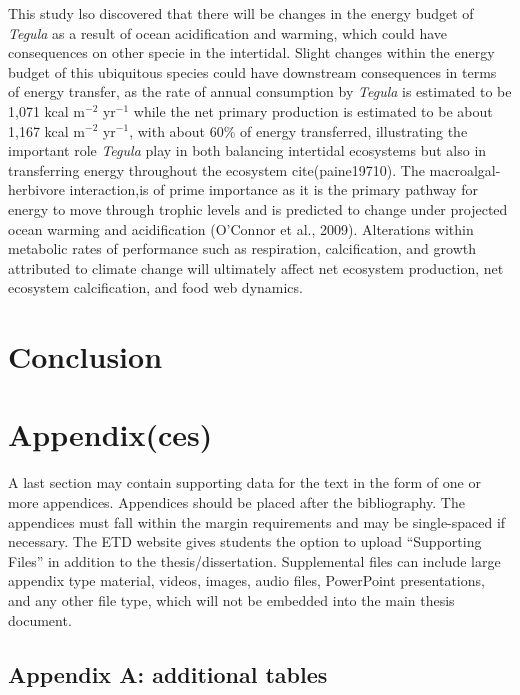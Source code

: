 \documentclass[
  12pt,
]{article}
\begin{document}
This study lso discovered that there will be changes in the energy
budget of \textit{Tegula} as a result of ocean acidification and
warming, which could have consequences on other specie in the
intertidal. Slight changes within the energy budget of this ubiquitous
species could have downstream consequences in terms of energy transfer,
as the rate of annual consumption by \textit{Tegula} is estimated to be
1,071 kcal m\(^{-2}\) yr\(^{-1}\) while the net primary production is
estimated to be about 1,167 kcal m\(^{-2}\) yr\(^{-1}\), with about 60\%
of energy transferred, illustrating the important role \textit{Tegula}
play in both balancing intertidal ecosystems but also in transferring
energy throughout the ecosystem cite(paine19710). The
macroalgal-herbivore interaction,is of prime importance as it is the
primary pathway for energy to move through trophic levels and is
predicted to change under projected ocean warming and acidification
(O'Connor et al., 2009). Alterations within metabolic rates of
performance such as respiration, calcification, and growth attributed to
climate change will ultimately affect net ecosystem production, net
ecosystem calcification, and food web dynamics. \newpage

\hypertarget{conclusion}{%
\section{Conclusion}\label{conclusion}}

\newpage



\newpage

\hypertarget{appendixces}{%
\section{Appendix(ces)}\label{appendixces}}

A last section may contain supporting data for the text in the form of
one or more appendices. Appendices should be placed after the
bibliography. The appendices must fall within the margin requirements
and may be single-spaced if necessary. The ETD website gives students
the option to upload ``Supporting Files'' in addition to the
thesis/dissertation. Supplemental files can include large appendix type
material, videos, images, audio files, PowerPoint presentations, and any
other file type, which will not be embedded into the main thesis
document.

\hypertarget{appendix-a-additional-tables}{%
\subsection{Appendix A: additional
tables}\label{appendix-a-additional-tables}}
\end{document}
